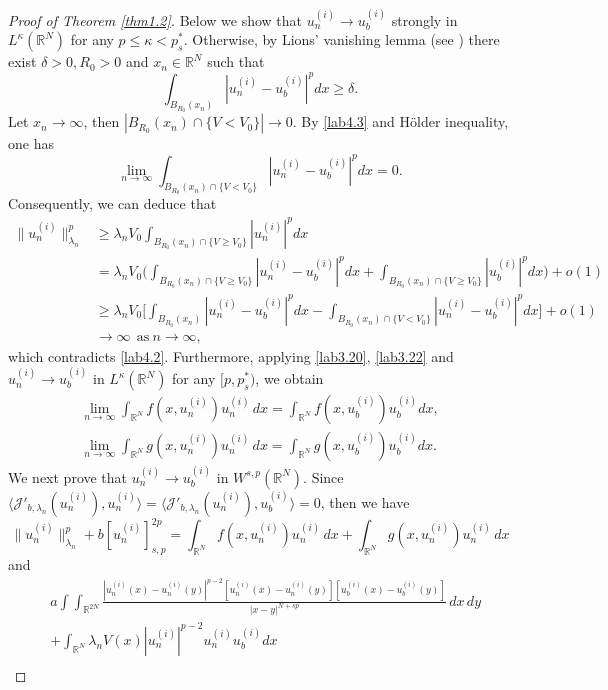 \documentclass[reqno]{amsart}
\begin{document}
\begin{proof}[Proof of Theorem \ref{thm1.2}]
Below we show that $u^{(i)}_n\to  u_{b}^{(i)}$ strongly in $L^\kappa(\mathbb{R}^N)$ 
for any $p\leq \kappa<p^*_s$. Otherwise, by Lions' vanishing lemma (see \cite{r29}) 
there exist $\delta>0, R_0>0$ and $x_n\in\mathbb{R}^N$ such that
$$
\int_{B_{R_0}(x_n)}|u^{(i)}_n-u_{b}^{(i)}|^p dx \geq \delta.
$$
Let $x_n\to \infty$, then $|B_{R_0}(x_n)\cap \{V<V_0\}|\to  0$. 
By \eqref{lab4.3} and H\"older inequality, one has
$$
\lim_{n\to \infty}\int_{B_{R_0}(x_n)\cap \{V<V_0\}}|u^{(i)}_n-u_b^{(i)}|^p dx=0.
$$
Consequently, we can deduce that
\begin{align*}
\|u^{(i)}_n\|^p_ {{\lambda_n}}
&\geq  \lambda_n V_0 \int_{B_{R_0}(x_n)\cap \{V\geq V_0\}}|u^{(i)}_n|^p dx   \\
&= \lambda_n V_0 \Big(\int_{B_{R_0}(x_n)\cap \{V\geq V_0\}}|u^{(i)}_n-u_b^{(i)}|^p dx
+\int_{B_{R_0}(x_n)\cap \{V\geq V_0\}}|u_b^{(i)}|^p dx\Big)+o(1)   \\
&\geq \lambda_n V_0 \Big[\int_{B_{R_0}(x_n)}|u^{(i)}_n-u_b^{(i)}|^p dx
 -\int_{B_{R_0}(x_n)\cap \{V<V_0\}}|u^{(i)}_n-u_b^{(i)}|^p dx\Big]+o(1) \\
&\to \infty\ \ \text{as}\ n\to \infty,
\end{align*}
which contradicts \eqref{lab4.2}. Furthermore, applying \eqref{lab3.20}, \eqref{lab3.22} 
and $u^{(i)}_n\to  u_b^{(i)}$ in $L^\kappa(\mathbb{R}^N)$ for any $[p, p_s^*)$, 
we obtain
\begin{gather}\label{lab4.4}
\lim_{n\to \infty}\int_{\mathbb{R}^N}f(x,u^{(i)}_n)u^{(i)}_n\,dx
=\int_{\mathbb{R}^N}f(x,u_b^{(i)})u_b^{(i)}dx,\\
\label{lab4.5}
\lim_{n\to \infty}\int_{\mathbb{R}^N}g(x,u^{(i)}_n)u^{(i)}_n\,dx
=\int_{\mathbb{R}^N}g(x,u_b^{(i)})u_b^{(i)}dx.
\end{gather}
We next prove that $u^{(i)}_n\to  u_b^{(i)}$ in $W^{s,p}(\mathbb{R}^N)$. 
Since $\langle \mathcal{J}'_{b, \lambda_n}(u^{(i)}_n), u^{(i)}_n \rangle
=\langle \mathcal{J}'_{b, \lambda_n}(u^{(i)}_n), u_b^{(i)} \rangle=0$, then we have
\begin{equation}\label{lab4.6}
\|u^{(i)}_n\|^p_{\lambda_n}+ b[u^{(i)}_n]^{2p}_{s,p}
= \int_{\mathbb{R}^N}f(x,u^{(i)}_n)u^{(i)}_n\,dx
 +\int_{\mathbb{R}^N}g(x,u^{(i)}_n)u^{(i)}_n\,dx
\end{equation}
and
\begin{align*}
&a\int\int_{\mathbb{R}^{2N}}\frac{|u^{(i)}_n(x)-u^{(i)}_n(y)|^{p-2}[u^{(i)}_n(x)
 -u^{(i)}_n(y)][u_b^{(i)}(x)-u_b^{(i)}(y)]}{|x-y|^{N+sp}}\,dx\,dy \\
&+\int_{\mathbb{R}^N}\lambda_nV(x)|u^{(i)}_n|^{p-2}u^{(i)}_nu_b^{(i)}dx   \\

\end{align*}
\end{proof}
\end{document}
